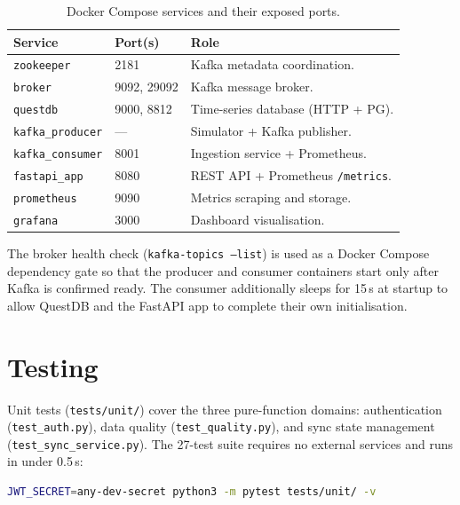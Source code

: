 \begin{table}[H]
  \centering
  \caption{Docker Compose services and their exposed ports.}
  \label{tab:services}
  \begin{tabularx}{\textwidth}{llX}
    \toprule
    \textbf{Service} & \textbf{Port(s)} & \textbf{Role} \\
    \midrule
    \texttt{zookeeper}      & 2181       & Kafka metadata coordination. \\
    \texttt{broker}         & 9092, 29092 & Kafka message broker. \\
    \texttt{questdb}        & 9000, 8812 & Time-series database (HTTP + PG). \\
    \texttt{kafka\_producer}& —          & Simulator + Kafka publisher. \\
    \texttt{kafka\_consumer}& 8001       & Ingestion service + Prometheus. \\
    \texttt{fastapi\_app}   & 8080       & REST API + Prometheus \texttt{/metrics}. \\
    \texttt{prometheus}     & 9090       & Metrics scraping and storage. \\
    \texttt{grafana}        & 3000       & Dashboard visualisation. \\
    \bottomrule
  \end{tabularx}
\end{table}

The broker health check (\texttt{kafka-topics --list}) is used as a
Docker Compose dependency gate so that the producer and consumer containers
start only after Kafka is confirmed ready.
The consumer additionally sleeps for 15\,s at startup to allow QuestDB and
the FastAPI app to complete their own initialisation.

\section{Testing}
\label{sec:testing}

Unit tests (\texttt{tests/unit/}) cover the three pure-function domains:
authentication (\texttt{test\_auth.py}), data quality
(\texttt{test\_quality.py}), and sync state management
(\texttt{test\_sync\_service.py}).
The 27-test suite requires no external services and runs in under
0.5\,s:

\begin{lstlisting}[language=bash, caption={Running the test suite.},
                   label={lst:tests}]
JWT_SECRET=any-dev-secret python3 -m pytest tests/unit/ -v
\end{lstlisting}

